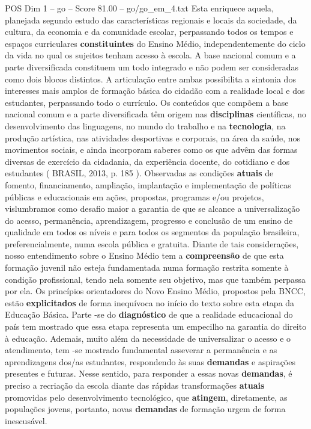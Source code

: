 \begin{textsample}{POS Dim 1 – go – Score 81.00 – go/go\_em\_4.txt}
Esta enriquece aquela, planejada segundo estudo das características regionais e locais da sociedade, da cultura, da economia e da comunidade escolar, perpassando todos os tempos e espaços curriculares \textbf{constituintes} do Ensino Médio, independentemente do ciclo da vida no qual os sujeitos tenham acesso à escola.
A base nacional comum e a parte diversificada constituem um todo integrado e não podem ser consideradas como dois blocos distintos.
A articulação entre ambas possibilita a sintonia dos interesses mais amplos de formação básica do cidadão com a realidade local e dos estudantes, perpassando todo o currículo.
Os conteúdos que compõem a base nacional comum e a parte diversificada têm origem nas \textbf{disciplinas} científicas, no desenvolvimento das linguagens, no mundo do trabalho e na \textbf{tecnologia}, na produção artística, nas atividades desportivas e corporais, na área da saúde, nos movimentos sociais, e ainda incorporam saberes como os que advêm das formas diversas de exercício da cidadania, da experiência docente, do cotidiano e dos estudantes ( BRASIL, 2013, p. 185 ).
Observadas as condições \textbf{atuais} de fomento, financiamento, ampliação, implantação e implementação de políticas públicas e educacionais em ações, propostas, programas e/ou projetos, vislumbramos como desafio maior a garantia de que se alcance a universalização do acesso, permanência, aprendizagem, progresso e conclusão de um ensino de qualidade em todos os níveis e para todos os segmentos da população brasileira, preferencialmente, numa escola pública e gratuita.
Diante de tais considerações, nosso entendimento sobre o Ensino Médio tem a \textbf{compreensão} de que esta formação juvenil não esteja fundamentada numa formação restrita somente à condição profissional, tendo nela somente seu objetivo, mas que também perpassa por ela.
Os princípios orientadores do Novo Ensino Médio, propostos pela BNCC, estão \textbf{explicitados} de forma inequívoca no início do texto sobre esta etapa da Educação Básica.
Parte -se do \textbf{diagnóstico} de que a realidade educacional do país tem mostrado que essa etapa representa um empecilho na garantia do direito à educação.
Ademais, muito além da necessidade de universalizar o acesso e o atendimento, tem -se mostrado fundamental asseverar a permanência e as aprendizagens dos/as estudantes, respondendo às suas \textbf{demandas} e aspirações presentes e futuras.
Nesse sentido, para responder a essas novas \textbf{demandas}, é preciso a recriação da escola diante das rápidas transformações \textbf{atuais} promovidas pelo desenvolvimento tecnológico, que \textbf{atingem}, diretamente, as populações jovens, portanto, novas \textbf{demandas} de formação urgem de forma inescusável.

\end{textsample}
